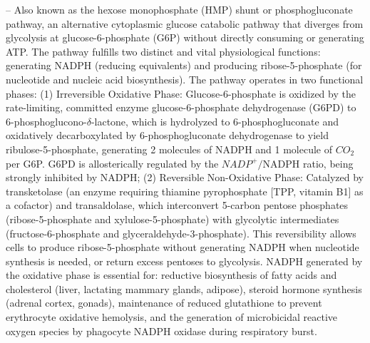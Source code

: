 -- Also known as the hexose monophosphate (HMP) shunt or phosphogluconate pathway, an alternative cytoplasmic glucose catabolic pathway that diverges from glycolysis at glucose-6-phosphate (G6P) without directly consuming or generating ATP. The pathway fulfills two distinct and vital physiological functions: generating NADPH (reducing equivalents) and producing ribose-5-phosphate (for nucleotide and nucleic acid biosynthesis). The pathway operates in two functional phases: (1) Irreversible Oxidative Phase: Glucose-6-phosphate is oxidized by the rate-limiting, committed enzyme glucose-6-phosphate dehydrogenase (G6PD) to 6-phosphoglucono-$\delta$-lactone, which is hydrolyzed to 6-phosphogluconate and oxidatively decarboxylated by 6-phosphogluconate dehydrogenase to yield ribulose-5-phosphate, generating 2 molecules of NADPH and 1 molecule of $CO_2$ per G6P. G6PD is allosterically regulated by the $NADP^+/\text{NADPH}$ ratio, being strongly inhibited by NADPH; (2) Reversible Non-Oxidative Phase: Catalyzed by transketolase (an enzyme requiring thiamine pyrophosphate [TPP, vitamin B1] as a cofactor) and transaldolase, which interconvert 5-carbon pentose phosphates (ribose-5-phosphate and xylulose-5-phosphate) with glycolytic intermediates (fructose-6-phosphate and glyceraldehyde-3-phosphate). This reversibility allows cells to produce ribose-5-phosphate without generating NADPH when nucleotide synthesis is needed, or return excess pentoses to glycolysis. NADPH generated by the oxidative phase is essential for: reductive biosynthesis of fatty acids and cholesterol (liver, lactating mammary glands, adipose), steroid hormone synthesis (adrenal cortex, gonads), maintenance of reduced glutathione to prevent erythrocyte oxidative hemolysis, and the generation of microbicidal reactive oxygen species by phagocyte NADPH oxidase during respiratory burst.

